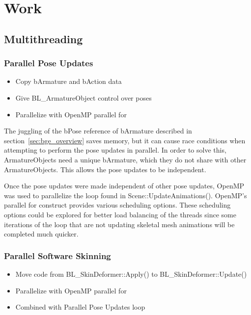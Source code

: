\section{Work}
\subsection{Multithreading}
\subsubsection{Parallel Pose Updates}
\begin{itemize}
 \item Copy bArmature and bAction data
 \item Give BL\_ArmatureObject control over poses
 \item Parallelize with OpenMP parallel for
\end{itemize}


The juggling of the bPose reference of bArmature described in section~\ref{sec:bge_overview} saves memory, but it can cause race conditions when attempting to perform the pose updates in parallel. In order to solve this, ArmatureObjects need a unique bArmature, which they do not share with other ArmatureObjects. This allows the pose updates to be independent.

Once the pose updates were made independent of other pose updates, OpenMP\cite{openmp} was used to parallelize the loop found in Scene::UpdateAnimations(). OpenMP's parallel for construct provides various scheduling options. These scheduling options could be explored for better load balancing of the threads since some iterations of the loop that are not updating skeletal mesh animations will be completed much quicker.



\subsubsection{Parallel Software Skinning}
\begin{itemize}
 \item Move code from BL\_SkinDeformer::Apply() to BL\_SkinDeformer::Update()
 \item Parallelize with OpenMP parallel for
 \item Combined with Parallel Pose Updates loop
\end{itemize}

